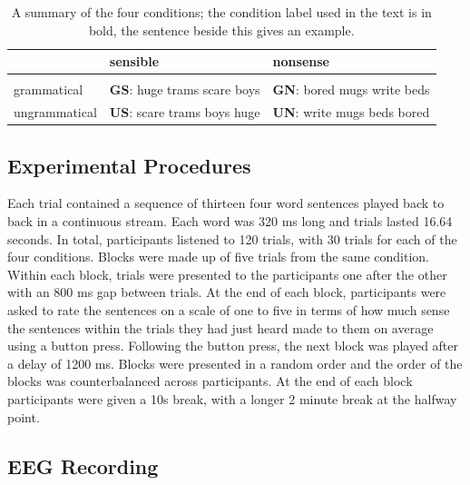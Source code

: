\documentclass[a4paper,10pt,twoside]{article}
\begin{document}
\begin{table}
\begin{tabular}{l|ll}
&sensible&nonsense\\
\hline\\
grammatical&\textbf{GS}: huge trams scare boys&\textbf{GN}: bored mugs write beds\\
ungrammatical &\textbf{US}: scare trams boys huge&\textbf{UN}: write mugs beds bored
\end{tabular}
\caption{A summary of the four conditions; the condition label used in the text is in
  bold, the sentence beside this gives an
  example.\label{tab:conditions}}
\end{table}

\subsection*{Experimental Procedures}
Each trial contained a sequence of thirteen four word sentences played back to back in a continuous stream. Each word was 320 ms long and trials lasted 16.64 seconds. In total, participants listened to 120 trials, with 30 trials for each of the four conditions.
%
%
Blocks were made up of five trials from the same condition. Within each block, trials were presented to the participants one after the other with an 800 ms gap between trials. At the end of each block, participants were asked to rate the sentences on a scale of one
to five in terms of how much sense the sentences within the trials they had just heard made to them on average using a button press. Following the button press, the next
block was played after a delay of 1200 ms.
%
%
Blocks were presented in a random order and the order of the blocks was counterbalanced across participants. At the end of each block participants were given a 10s break, with a longer 2 minute break at the halfway point.


 

\subsection*{EEG Recording}
\end{document}

